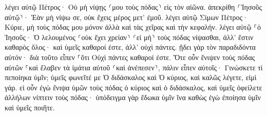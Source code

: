 \documentclass{openreader}
\begin{document}
λέγει αὐτῷ Πέτρος· Οὐ μὴ νίψῃς ⸂μου τοὺς πόδας⸃ εἰς τὸν αἰῶνα. ἀπεκρίθη ⸂Ἰησοῦς αὐτῷ⸃· Ἐὰν μὴ νίψω σε, οὐκ ἔχεις μέρος μετ’ ἐμοῦ. 
λέγει αὐτῷ Σίμων Πέτρος· Κύριε, μὴ τοὺς πόδας μου μόνον ἀλλὰ καὶ τὰς χεῖρας καὶ τὴν κεφαλήν. 
λέγει αὐτῷ ⸀ὁ Ἰησοῦς· Ὁ λελουμένος ⸂οὐκ ἔχει χρείαν⸃ ⸂εἰ μὴ⸃ τοὺς πόδας νίψασθαι, ἀλλ’ ἔστιν καθαρὸς ὅλος· καὶ ὑμεῖς καθαροί ἐστε, ἀλλ’ οὐχὶ πάντες. 
ᾔδει γὰρ τὸν παραδιδόντα αὐτόν· διὰ τοῦτο εἶπεν ⸀ὅτι Οὐχὶ πάντες καθαροί ἐστε. 
Ὅτε οὖν ἔνιψεν τοὺς πόδας αὐτῶν ⸀καὶ ἔλαβεν τὰ ἱμάτια αὐτοῦ ⸂καὶ ἀνέπεσεν⸃, πάλιν εἶπεν αὐτοῖς· Γινώσκετε τί πεποίηκα ὑμῖν; 
ὑμεῖς φωνεῖτέ με Ὁ διδάσκαλος καὶ Ὁ κύριος, καὶ καλῶς λέγετε, εἰμὶ γάρ. 
εἰ οὖν ἐγὼ ἔνιψα ὑμῶν τοὺς πόδας ὁ κύριος καὶ ὁ διδάσκαλος, καὶ ὑμεῖς ὀφείλετε ἀλλήλων νίπτειν τοὺς πόδας· 
ὑπόδειγμα γὰρ ἔδωκα ὑμῖν ἵνα καθὼς ἐγὼ ἐποίησα ὑμῖν καὶ ὑμεῖς ποιῆτε. 
\end{document}
